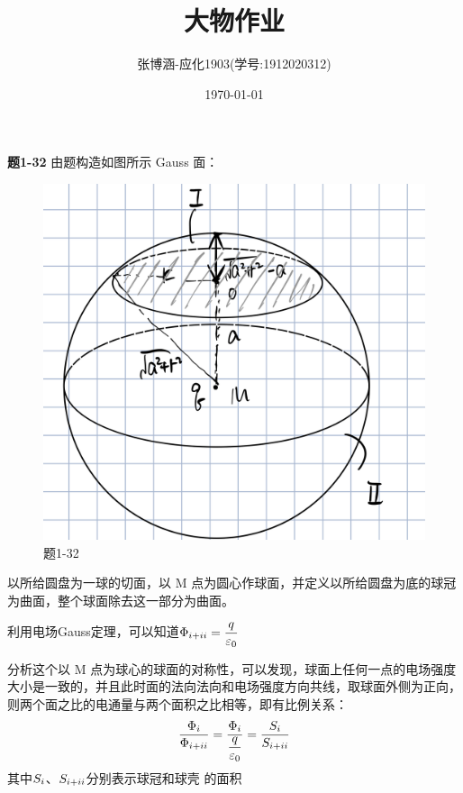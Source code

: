 \documentclass{article}
\title{大物作业}
\author{张博涵-应化1903(学号:1912020312)}
\date{\today}
\begin{document}
\maketitle

\textbf{题1-32}
由题构造如图所示 Gauss 面：
\begin{figure}[h]
	\centering
	\includegraphics[scale = 0.1]{1}
	\caption{题1-32}
\end{figure}


以所给圆盘为一球的切面，以 M 点为圆心作球面，并定义以所给圆盘为底的球冠为曲面\uppercase\expandafter{}，整个球面除去这一部分为曲面\uppercase\expandafter{}。

利用电场Gauss定理，可以知道$\displaystyle\Phi _{\uppercase\expandafter{\romannumeral1}+\uppercase\expandafter{\romannumeral2}} =\dfrac{q}{\varepsilon_0}$

分析这个以 M 点为球心的球面的对称性，可以发现，球面上任何一点的电场强度大小是一致的，并且此时面的法向法向和电场强度方向共线，取球面外侧为正向，则两个面之比的电通量与两个面积之比相等，即有比例关系：
\begin{equation}
	\dfrac{\Phi _{\uppercase\expandafter{\romannumeral1}}}{\Phi _{\uppercase\expandafter{\romannumeral1}+\uppercase\expandafter{\romannumeral2}}} = \dfrac{\Phi _{\uppercase\expandafter{\romannumeral1}}}{\dfrac{q}{\varepsilon_0}} = \dfrac{S_{\uppercase\expandafter{\romannumeral1}}}{S_{\uppercase\expandafter{\romannumeral1}+\uppercase\expandafter{\romannumeral2}}}
\end{equation}
其中$S_{\uppercase\expandafter{\romannumeral1}}$、$S_{\uppercase\expandafter{\romannumeral1}+\uppercase\expandafter{\romannumeral2}}$分别表示球冠和球壳 的面积
\end{document}
